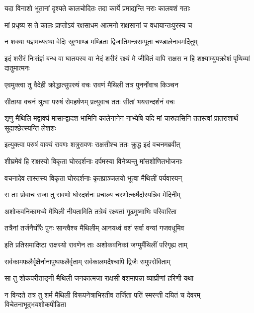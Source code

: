 \twolineshloka
{यदा विनाशो भूतानां दृश्यते कालचोदितः}
{तदा कार्ये प्रमाद्यन्ति नराः कालवशं गताः} %

\twolineshloka
{मां प्रधृष्य स ते कालः प्राप्तोऽयं रक्षसाधम}
{आत्मनो राक्षसानां च वधायान्तःपुरस्य च} %

\twolineshloka
{न शक्या यज्ञमध्यस्था वेदिः स्रुग्भाण्ड मण्डिता}
{द्विजातिमन्त्रसम्पूता चण्डालेनावमर्दितुम्} %

\threelineshloka
{इदं शरीरं निःसंज्ञं बन्ध वा घातयस्व वा}
{नेदं शरीरं रक्ष्यं मे जीवितं वापि राक्षस}
{न हि शक्ष्याम्युपक्रोशं पृथिव्यां दातुमात्मनः} %

\twolineshloka
{एवमुक्त्वा तु वैदेही क्रोद्धात्सुपरुषं वचः}
{रावणं मैथिली तत्र पुनर्नोवाच किञ्चन} %

\twolineshloka
{सीताया वचनं श्रुत्वा परुषं रोमहर्षणम्}
{प्रत्युवाच ततः सीतां भयसन्दर्शनं वचः} %

\threelineshloka
{शृणु मैथिलि मद्वाक्यं मासान्द्वादश भामिनि}
{कालेनानेन नाभ्येषि यदि मां चारुहासिनि}
{ततस्त्वां प्रातराशार्थं सूदाश्छेत्स्यन्ति लेशशः} %

\twolineshloka
{इत्युक्त्वा परुषं वाक्यं रावणः शत्रुरावणः}
{राक्षसीश्च ततः क्रुद्ध इदं वचनमब्रवीत्} %

\twolineshloka
{शीघ्रमेवं हि राक्षस्यो विकृता घोरदर्शनाः}
{दर्पमस्या विनेष्यन्तु मांसशोणितभोजनाः} %

\twolineshloka
{वचनादेव तास्तस्य विकृता घोरदर्शनाः}
{कृतप्राञ्जलयो भूत्वा मैथिलीं पर्यवारयन्} %

\twolineshloka
{स ताः प्रोवाच राजा तु रावणो घोरदर्शनः}
{प्रचाल्य चरणोत्कर्षैर्दारयन्निव मेदिनीम्} %

\twolineshloka
{अशोकवनिकामध्ये मैथिली नीयतामिति}
{तत्रेयं रक्ष्यतां गूढमुष्माभिः परिवारिता} %

\twolineshloka
{तत्रैनां तर्जनैर्घोरैः पुनः सान्त्वैश्च मैथिलीम्}
{आनयध्वं वशं सर्वा वन्यां गजवधूमिव} %

\twolineshloka
{इति प्रतिसमादिष्टा राक्षस्यो रावणेन ताः}
{अशोकवनिकां जग्मुर्मैथिलीं परिगृह्य ताम्} %

\twolineshloka
{सर्वकामफलैर्वृक्षैर्नानापुष्पफलैर्वृताम्}
{सर्वकालमदैश्चापि द्विजैः समुपसेविताम्} %

\twolineshloka
{सा तु शोकपरीताङ्गी मैथिली जनकात्मजा}
{राक्षसी वशमापन्ना व्याघ्रीणां हरिणी यथा} %

\fourlineindentedshloka
{न विन्दते तत्र तु शर्म मैथिली}
{विरूपनेत्राभिरतीव तर्जिता}
{पतिं स्मरन्ती दयितं च देवरम्}
{विचेतनाभूद्भयशोकपीडिता} %


